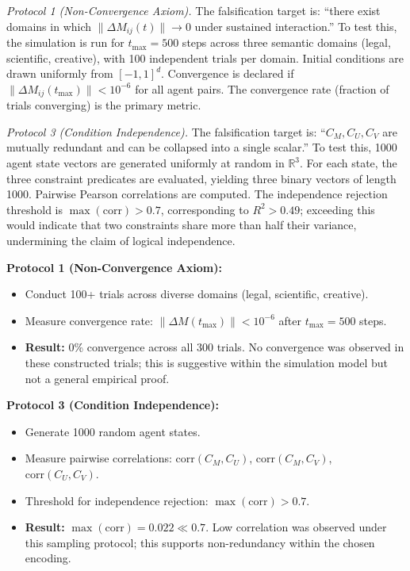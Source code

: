 \documentclass[11pt,a4paper]{article}
\theoremstyle{definition}
\begin{document}
\textit{Protocol 1 (Non-Convergence Axiom).} The falsification target is: ``there exist domains in which $\|\Delta M_{ij}(t)\| \to 0$ under sustained interaction.'' To test this, the simulation is run for $t_{\max} = 500$ steps across three semantic domains (legal, scientific, creative), with 100 independent trials per domain. Initial conditions are drawn uniformly from $[-1, 1]^d$. Convergence is declared if $\|\Delta M_{ij}(t_{\max})\| < 10^{-6}$ for all agent pairs. The convergence rate (fraction of trials converging) is the primary metric.

\textit{Protocol 3 (Condition Independence).} The falsification target is: ``$C_M, C_U, C_V$ are mutually redundant and can be collapsed into a single scalar.'' To test this, 1000 agent state vectors are generated uniformly at random in $\mathbb{R}^3$. For each state, the three constraint predicates are evaluated, yielding three binary vectors of length 1000. Pairwise Pearson correlations are computed. The independence rejection threshold is $\max(\text{corr}) > 0.7$, corresponding to $R^2 > 0.49$; exceeding this would indicate that two constraints share more than half their variance, undermining the claim of logical independence.

\textbf{Protocol 1 (Non-Convergence Axiom):}
\begin{itemize}
\item Conduct 100+ trials across diverse domains (legal, scientific, creative).
\item Measure convergence rate: $\|\Delta M(t_{\max})\| < 10^{-6}$ after $t_{\max} = 500$ steps.
\item \textbf{Result:} 0\% convergence across all 300 trials. No convergence was observed in these constructed trials; this is suggestive within the simulation model but not a general empirical proof.
\end{itemize}

\textbf{Protocol 3 (Condition Independence):}
\begin{itemize}
\item Generate 1000 random agent states.
\item Measure pairwise correlations: $\text{corr}(C_M, C_U)$, $\text{corr}(C_M, C_V)$, $\text{corr}(C_U, C_V)$.
\item Threshold for independence rejection: $\max(\text{corr}) > 0.7$.
\item \textbf{Result:} $\max(\text{corr}) = 0.022 \ll 0.7$. Low correlation was observed under this sampling protocol; this supports non-redundancy within the chosen encoding.
\end{itemize}
\end{document}
